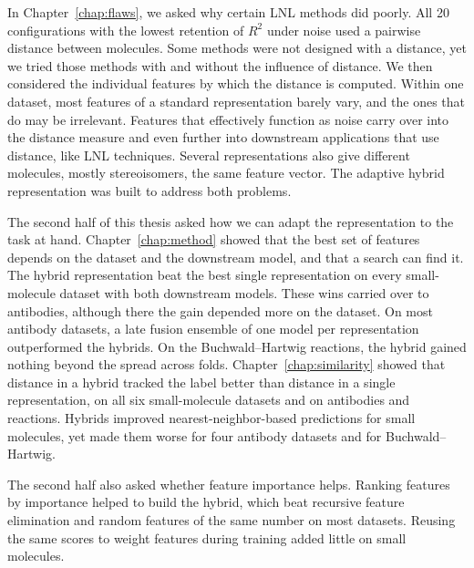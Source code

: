 In Chapter~\ref{chap:flaws}, we asked why certain LNL methods did poorly. All 20 configurations with the lowest retention of $R^2$ under noise used a pairwise distance between molecules. Some methods were not designed with a distance, yet we tried those methods with and without the influence of distance. We then considered the individual features by which the distance is computed. Within one dataset, most features of a standard representation barely vary, and the ones that do may be irrelevant. Features that effectively function as noise carry over into the distance measure and even further into downstream applications that use distance, like LNL techniques. Several representations also give different molecules, mostly stereoisomers, the same feature vector. The adaptive hybrid representation was built to address both problems.

The second half of this thesis asked how we can adapt the representation to the task at hand. Chapter~\ref{chap:method} showed that the best set of features depends on the dataset and the downstream model, and that a search can find it. The hybrid representation beat the best single representation on every small-molecule dataset with both downstream models. These wins carried over to antibodies, although there the gain depended more on the dataset. On most antibody datasets, a late fusion ensemble of one model per representation outperformed the hybrids. On the Buchwald--Hartwig reactions, the hybrid gained nothing beyond the spread across folds. Chapter~\ref{chap:similarity} showed that distance in a hybrid tracked the label better than distance in a single representation, on all six small-molecule datasets and on antibodies and reactions. Hybrids improved nearest-neighbor-based predictions for small molecules, yet made them worse for four antibody datasets and for Buchwald--Hartwig.

The second half also asked whether feature importance helps. Ranking features by importance helped to build the hybrid, which beat recursive feature elimination and random features of the same number on most datasets. Reusing the same scores to weight features during training added little on small molecules.

